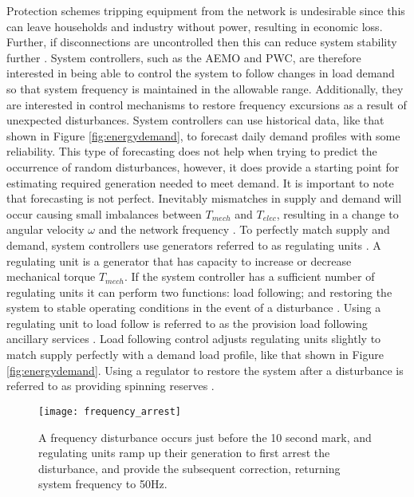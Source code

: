 Protection schemes tripping equipment from the network is undesirable since this can leave households and industry without power, resulting in economic loss. Further, if disconnections are uncontrolled then this can reduce system stability further \cite{AEMOpowerfreqriskrev}. System controllers, such as the AEMO and PWC, are therefore interested in being able to control the system to follow changes in load demand so that system frequency is maintained in the allowable range. Additionally, they are interested in control mechanisms to restore frequency excursions as a result of unexpected disturbances. System controllers can use historical data, like that shown in Figure \ref{fig:energydemand}, to forecast daily demand profiles with some reliability. This type of forecasting does not help when trying to predict the occurrence of random disturbances, however, it does provide a starting point for estimating required generation needed to meet demand. It is important to note that forecasting is not perfect. Inevitably mismatches in supply and demand will occur causing small imbalances between $T_{mech}$ and $T_{elec}$, resulting in a change to angular velocity $\omega$ and the network frequency \cite{Glover2012}. To perfectly match supply and demand, system controllers use generators referred to as regulating units \cite{Kothari2011}. A regulating unit is a generator that has capacity to increase or decrease mechanical torque $T_{mech}$. If the system controller has a sufficient number of regulating units it can perform two functions: load following; and restoring the system to stable operating conditions in the event of a disturbance \cite{Grainger1994}. Using a regulating unit to load follow is referred to as the provision load following ancillary services \cite{AEMOancilliaryserv}. Load following control adjusts regulating units slightly to match supply perfectly with a demand load profile, like that shown in Figure \ref{fig:energydemand}. Using a regulator to restore the system after a disturbance is referred to as providing spinning reserves \cite{AEMOancilliaryserv}.

\begin{figure}[ht]
\centering
\texttt{[image: frequency\_arrest]}
\caption{A frequency disturbance occurs just before the 10 second mark, and regulating units ramp up their generation to first arrest the disturbance, and provide the subsequent correction, returning system frequency to 50$\si{\hertz}$.}
\label{fig:freqarrest}
\end{figure}

